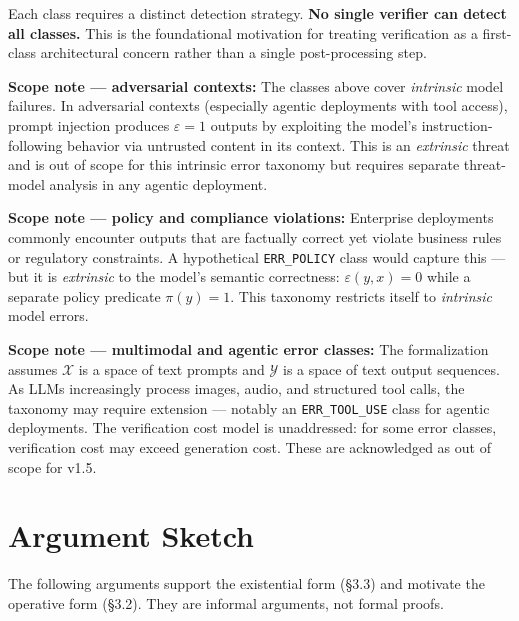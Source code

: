\documentclass[11pt,a4paper]{article}
\begin{document}
Each class requires a distinct detection strategy. \textbf{No single verifier can detect all classes.} This is the foundational motivation for treating verification as a first-class architectural concern rather than a single post-processing step.

\begin{notebox}
\textbf{Scope note --- adversarial contexts:} The classes above cover \emph{intrinsic} model failures. In adversarial contexts (especially agentic deployments with tool access), prompt injection produces $\varepsilon = 1$ outputs by exploiting the model's instruction-following behavior via untrusted content in its context. This is an \emph{extrinsic} threat and is out of scope for this intrinsic error taxonomy but requires separate threat-model analysis in any agentic deployment.
\end{notebox}

\begin{notebox}
\textbf{Scope note --- policy and compliance violations:} Enterprise deployments commonly encounter outputs that are factually correct yet violate business rules or regulatory constraints. A hypothetical \texttt{ERR\_POLICY} class would capture this --- but it is \emph{extrinsic} to the model's semantic correctness: $\varepsilon(y,x) = 0$ while a separate policy predicate $\pi(y) = 1$. This taxonomy restricts itself to \emph{intrinsic} model errors.
\end{notebox}

\begin{notebox}
\textbf{Scope note --- multimodal and agentic error classes:} The formalization assumes $\mathcal{X}$ is a space of text prompts and $\mathcal{Y}$ is a space of text output sequences. As LLMs increasingly process images, audio, and structured tool calls, the taxonomy may require extension --- notably an \texttt{ERR\_TOOL\_USE} class for agentic deployments. The verification cost model is unaddressed: for some error classes, verification cost may exceed generation cost. These are acknowledged as out of scope for v1.5.
\end{notebox}

\section{Argument Sketch}

The following arguments support the existential form (\S3.3) and motivate the operative form (\S3.2). They are informal arguments, not formal proofs.
\end{document}
